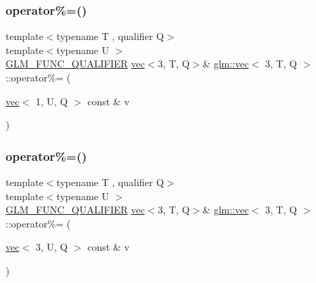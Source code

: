 \mbox{\label{structglm_1_1vec_3_013_00_01_t_00_01_q_01_4_af436942fa5f5b2329bede870f539a223}} 
\subsubsection{\texorpdfstring{operator\%=()}{operator\%=()}\hspace{0.1cm}{\footnotesize\ttfamily [5/6]}}
{\footnotesize\ttfamily template$<$typename T , qualifier Q$>$ \\
template$<$typename U $>$ \\
\hyperlink{setup_8hpp_a33fdea6f91c5f834105f7415e2a64407}{G\+L\+M\+\_\+\+F\+U\+N\+C\+\_\+\+Q\+U\+A\+L\+I\+F\+I\+ER} \hyperlink{structglm_1_1vec}{vec}$<$3, T, Q$>$\& \hyperlink{structglm_1_1vec}{glm\+::vec}$<$ 3, T, Q $>$\+::operator\%= (\begin{DoxyParamCaption}\item[{\hyperlink{structglm_1_1vec}{vec}$<$ 1, U, Q $>$ const \&}]{v }\end{DoxyParamCaption})}

\mbox{\label{structglm_1_1vec_3_013_00_01_t_00_01_q_01_4_ae6a625383036d5b89748613801ad94e6}} 
\subsubsection{\texorpdfstring{operator\%=()}{operator\%=()}\hspace{0.1cm}{\footnotesize\ttfamily [6/6]}}
{\footnotesize\ttfamily template$<$typename T , qualifier Q$>$ \\
template$<$typename U $>$ \\
\hyperlink{setup_8hpp_a33fdea6f91c5f834105f7415e2a64407}{G\+L\+M\+\_\+\+F\+U\+N\+C\+\_\+\+Q\+U\+A\+L\+I\+F\+I\+ER} \hyperlink{structglm_1_1vec}{vec}$<$3, T, Q$>$\& \hyperlink{structglm_1_1vec}{glm\+::vec}$<$ 3, T, Q $>$\+::operator\%= (\begin{DoxyParamCaption}\item[{\hyperlink{structglm_1_1vec}{vec}$<$ 3, U, Q $>$ const \&}]{v }\end{DoxyParamCaption})}

